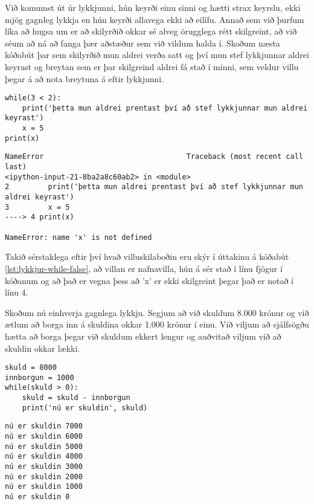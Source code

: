 Við komumst út úr lykkjunni, hún keyrði einu sinni og hætti strax keyrslu, ekki mjög gagnleg lykkja en hún keyrði allavega ekki að eilífu.
Annað sem við þurfum líka að hugsa um er að skilyrðið okkar sé alveg örugglega rétt skilgreint, að við séum að ná að fanga þær aðstæður sem við vildum halda í.
Skoðum næsta kóðabút þar sem skilyrðið mun aldrei verða satt og því mun stef lykkjunnar aldrei keyrast og breytan sem er þar skilgreind aldrei fá stað í minni, sem veldur villu þegar á að nota breytuna á eftir lykkjunni. 

\begin{lstlisting}[caption=while lykkja sem keyrir aldrei, label=lst:lykkjur-while-false]
while(3 < 2):
	print('þetta mun aldrei prentast því að stef lykkjunnar mun aldrei keyrast')
	x = 5
print(x)
\end{lstlisting}
\lstset{style=uttak}
\begin{lstlisting}
NameError                                 Traceback (most recent call last)
<ipython-input-21-8ba2a8c60ab2> in <module>
2         print('þetta mun aldrei prentast því að stef lykkjunnar mun aldrei keyrast')
3         x = 5
----> 4 print(x)

NameError: name 'x' is not defined
\end{lstlisting}
\lstset{style=venjulegt}

Takið sérstaklega eftir því hvað villuskilaboðin eru skýr í úttakinu á kóðabút \ref{lst:lykkjur-while-false}, að villan er nafnavilla, hún á sér stað í línu fjögur í kóðanum og að það er vegna þess að 'x' er ekki skilgreint þegar það er notað í línu 4.

Skoðum nú einhverja gagnlega lykkju.
Segjum að við skuldum 8.000 krónur og við ætlum að borga inn á skuldina okkar 1.000 krónur í einu.
Við viljum að sjálfsögðu hætta að borga þegar við skuldum ekkert lengur og auðvitað viljum við að skuldin okkar lækki.

\begin{lstlisting}[caption=while lykkja sem eitthvað vit er í, label=lst:lykkjur-while-skuld]
skuld = 8000
innborgun = 1000
while(skuld > 0):
	skuld = skuld - innborgun
	print('nú er skuldin', skuld)
\end{lstlisting}
\lstset{style=uttak}
\begin{lstlisting}
nú er skuldin 7000
nú er skuldin 6000
nú er skuldin 5000
nú er skuldin 4000
nú er skuldin 3000
nú er skuldin 2000
nú er skuldin 1000
nú er skuldin 0
\end{lstlisting}
\lstset{style=venjulegt}

